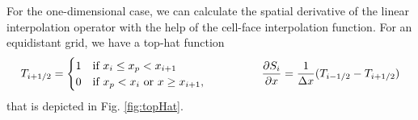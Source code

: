 For the one-dimensional case, we can calculate the spatial derivative of the linear interpolation operator with the help of the cell-face interpolation function. For an equidistant grid, we have a top-hat function
\begin{equation*}
    T_{i+1/2} = \begin{cases}
        1 & \text{if }   x_i \leq x_p < x_{i+1} \\
        0 & \text{if }   x_p < x_{i} \text{ or } x \geq x_{i+1},
    \end{cases} \qquad \hspace{1cm}
    \label{eq:gradInterp}
    \dfrac{\partial S_i}{\partial x} = \dfrac{1}{\Delta x} ( T_{i-1/2} - T_{i+1/2})
\end{equation*}
that is depicted in Fig. \ref{fig:topHat}.
